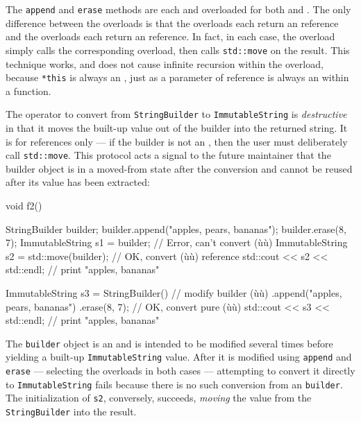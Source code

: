\noindent The \lstinline!append! and \lstinline!erase! methods are each
 and overloaded for both  and
. The only difference between the overloads is that the
 overloads each return an  reference and the
 overloads each return an  reference. In fact,
in each case, the  overload simply calls the corresponding
 overload, then calls \lstinline!std::move! on the result.
This technique works, and does not cause infinite recursion within the
 overload, because \lstinline!*this! is always an
, just as a parameter of  reference is always
an  within a function.

The operator to convert from \lstinline!StringBuilder! to
\lstinline!ImmutableString! is \emph{destructive} in that it moves the
built-up value out of the builder into the returned string. It is
 for  references only --- if the
builder is not an , then the user must deliberately call
\lstinline!std::move!. This protocol acts a signal to the future maintainer
that the builder object is in a moved-from state after the conversion
and cannot be reused after its value has been extracted:

\begin{emcppslisting}
void f2()
{
    StringBuilder builder;
    builder.append("apples, pears, bananas");
    builder.erase(8, 7);
    ImmutableString s1 = builder;             // Error, can't convert (ù{}ù)
    ImmutableString s2 = std::move(builder);  // OK, convert (ù{}ù) reference
    std::cout << s2 << std::endl;             // print "apples, bananas"

    ImmutableString s3 = StringBuilder()      // modify builder (ù{}ù)
        .append("apples, pears, bananas")
        .erase(8, 7);                         // OK, convert pure (ù{}ù)
    std::cout << s3 << std::endl;             // print "apples, bananas"
}
\end{emcppslisting}
    

\noindent The \lstinline!builder! object is an  and is intended to be
modified several times before yielding a built-up
\lstinline!ImmutableString! value. After it is modified using
\lstinline!append! and \lstinline!erase! --- selecting the 
overloads in both cases --- attempting to convert it directly to
\lstinline!ImmutableString! fails because there is no such conversion from
an  \lstinline!builder!. The initialization of \lstinline!s2!,
conversely, succeeds, \emph{moving} the value from the
\lstinline!StringBuilder! into the result.

